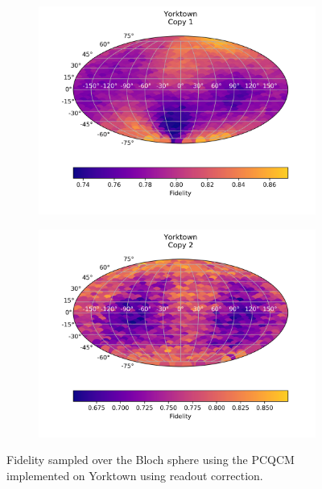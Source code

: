 \begin{figure}[H]
  \centering
  \begin{subfigure}{.5\textwidth}
    \centering
    \includegraphics[width=\textwidth]{Figures/PhaseCovariant/IBM/FullSphere/results_corrected_ibmqx2_copy1.png}
    
    \label{fig:pc_corrected_yorktown_sphere_1}
  \end{subfigure}%
  \begin{subfigure}{.5\textwidth}
    \centering
    \includegraphics[width=\textwidth]{Figures/PhaseCovariant/IBM/FullSphere/results_corrected_ibmqx2_copy2.png}
    
    \label{fig:pc_corrected_yorktown_sphere_2}
  \end{subfigure}
  \caption{Fidelity sampled over the Bloch sphere using the PCQCM implemented on Yorktown using readout correction.}
  \label{fig:pc_corrected_yorktown_sphere}
\end{figure}

